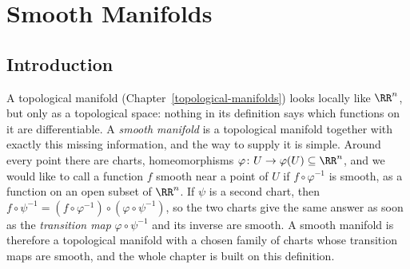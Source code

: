 \chapter{Smooth Manifolds}\label{smooth-manifolds}

\section{Introduction}\label{smooth-manifolds:section-introduction}

A topological manifold (Chapter~\ref{topological-manifolds}) looks locally like $\RR^n$, but only as a topological space: nothing in its definition says which
functions on it are differentiable. A \emph{smooth manifold} is a topological manifold together with exactly this missing information, and the way to supply it
is simple. Around every point there are charts, homeomorphisms $\varphi \colon U \to \varphi(U) \subseteq \RR^n$, and we would like to call a function $f$ smooth
near a point of $U$ if $f \circ \varphi^{-1}$ is smooth, as a function on an open subset of $\RR^n$. If $\psi$ is a second chart, then
$f \circ \psi^{-1} = (f \circ \varphi^{-1}) \circ (\varphi \circ \psi^{-1})$, so the two charts give the same answer as soon as the \emph{transition map}
$\varphi \circ \psi^{-1}$ and its inverse are smooth. A smooth manifold is therefore a topological manifold with a chosen family of charts whose transition maps
are smooth, and the whole chapter is built on this definition.

